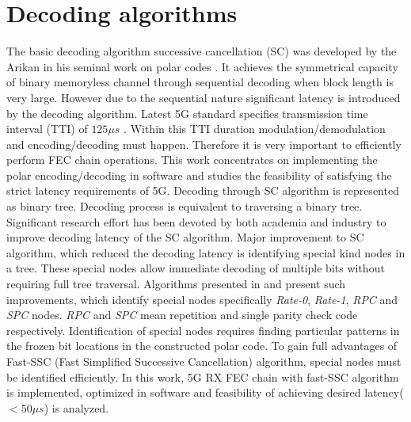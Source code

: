 
\section{Decoding algorithms}
The basic decoding algorithm successive cancellation (SC) was developed by the Arikan in his seminal work on polar codes \cite{Arikan}. It achieves the symmetrical capacity of binary memoryless channel through sequential decoding when block length is very large. However due to the sequential nature significant latency is introduced by the decoding algorithm. Latest 5G standard specifies transmission time interval (TTI) of $125 \mu s$ \cite{5G_TTI}. Within this TTI duration modulation/demodulation and encoding/decoding must happen. Therefore it is very important to efficiently perform FEC chain operations. This work concentrates on implementing the polar encoding/decoding in software and studies the feasibility of satisfying the strict latency requirements of 5G. Decoding through SC algorithm is represented as binary tree. Decoding process is equivalent to traversing a binary tree. Significant research effort has been devoted by both academia and industry to improve decoding latency of the SC algorithm. Major improvement to SC algorithm, which reduced the decoding latency is identifying special kind nodes in a tree. These special nodes allow immediate decoding of multiple bits without requiring full tree traversal. Algorithms presented in \cite{SSC} and \cite{fastSSC} present such improvements, which identify special nodes specifically \textit{Rate-0}, \textit{Rate-1}, \textit{RPC} and \textit{SPC} nodes. \textit{RPC} and \textit{SPC} mean repetition and single parity check code respectively. Identification of special nodes requires finding particular patterns in the frozen bit locations in the constructed polar code. To gain full advantages of Fast-SSC (Fast Simplified Successive Cancellation) algorithm, special nodes must be identified efficiently. In this work, 5G RX FEC chain with fast-SSC algorithm is implemented, optimized in software and feasibility of achieving desired latency( $< 50\mu s$) is analyzed.


